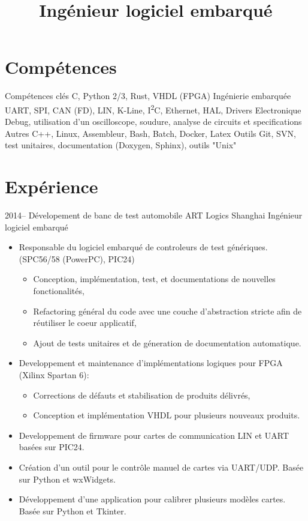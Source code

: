 \documentclass[11pt,a4paper,sans]{moderncv}        %
\title{Ingénieur logiciel embarqué}
\begin{document}
\makecvtitle

\section{Compétences}
\cvitem
  {Compétences clés}
  {C, Python 2/3, Rust, VHDL (FPGA)}
\cvitem
  {Ingénierie embarquée}
  {UART, SPI, CAN (FD), LIN, K-Line, I\textsuperscript{2}C, Ethernet, HAL, Drivers}
\cvitem
  {Electronique}
  {Debug, utilisation d'un oscilloscope, soudure, analyse de circuits et specifications}
\cvitem
  {Autres}
  {C++, Linux, Assembleur, Bash, Batch, Docker, Latex}
\cvitem
  {Outils}
  {Git, SVN, test unitaires, documentation (Doxygen, Sphinx), outils "Unix"}

\section{Expérience}
\cventry
  {2014--\the\year}
  {Dévelopement de banc de test automobile}
  {ART Logics}
  {Shanghai}
  {Ingénieur logiciel embarqué}
  {
    \begin{itemize}%
    \item Responsable du logiciel embarqué de controleurs de test génériques. (SPC56/58 (PowerPC), PIC24)
      \begin{itemize}%
      \item Conception, implémentation, test, et documentations de nouvelles fonctionalités,
      \item Refactoring général du code avec une couche d'abstraction stricte afin de réutiliser le coeur applicatif,
      \item Ajout de tests unitaires et de géneration de documentation automatique.
      \end{itemize}
    \item Developpement et maintenance d'implémentations logiques pour FPGA (Xilinx Spartan 6):
      \begin{itemize}%
      \item Corrections de défauts et stabilisation de produits délivrés,
      \item Conception et implémentation VHDL pour plusieurs nouveaux produits.
      \end{itemize}
    \item Developpement de firmware pour cartes de communication LIN et UART basées sur PIC24.
    \item Création d'un outil pour le contrôle manuel de cartes via UART/UDP. Basée sur Python et wxWidgets.
    \item Développement d'une application pour calibrer plusieurs modèles cartes. Basée sur Python et Tkinter.
    \end{itemize}
  }
\end{document}

